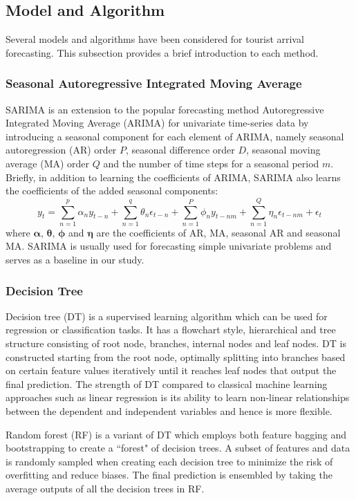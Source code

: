 \documentclass{article}
\begin{document}
\subsection{Model and Algorithm}
Several models and algorithms have been considered for tourist arrival forecasting. This subsection provides a brief introduction to each method.
\subsubsection{Seasonal Autoregressive Integrated Moving Average}
SARIMA is an extension to the popular forecasting method Autoregressive Integrated Moving Average (ARIMA) for univariate time-series data by introducing a seasonal component for each element of ARIMA, namely seasonal autoregression (AR) order $P$, seasonal difference order $D$, seasonal moving average (MA) order $Q$ and the number of time steps for a seasonal period $m$. Briefly, in addition to learning the coefficients of ARIMA, SARIMA also learns the coefficients of the added seasonal components:
\[
y_t = \sum_{n=1}^p \alpha_n y_{t-n} + \sum_{n=1}^q \theta_n \epsilon_{t-n} + \sum_{n=1}^P \phi_n y_{t-nm} + \sum_{n=1}^Q \eta_n \epsilon_{t-nm} + \epsilon_t
\]
where $\boldsymbol{\alpha}$, $\boldsymbol{\theta}$, $\boldsymbol{\phi}$ and $\boldsymbol{\eta}$ are the coefficients of AR, MA, seasonal AR and seasonal MA. SARIMA is usually used for forecasting simple univariate problems and  serves as a baseline in our study.

\subsubsection{Decision Tree}
Decision tree (DT) \cite{decisiontree} is a supervised learning algorithm which can be used for regression or classification tasks. It has a flowchart style, hierarchical and tree structure consisting of root node, branches, internal nodes and leaf nodes. DT is constructed starting from the root node, optimally splitting into branches based on certain feature values iteratively until it reaches leaf nodes that output the final prediction. The strength of DT compared to classical machine learning approaches such as linear regression is its ability to learn non-linear relationships between the dependent and independent variables and hence is more flexible.

Random forest (RF) \cite{randomforest} is a variant of DT which employs both feature bagging and bootstrapping to create a ``forest" of decision trees. A subset of features and data is randomly sampled when creating each decision tree to minimize the risk of overfitting and reduce biases. The final prediction is ensembled by taking the average outputs of all the decision trees in RF.
\end{document}
